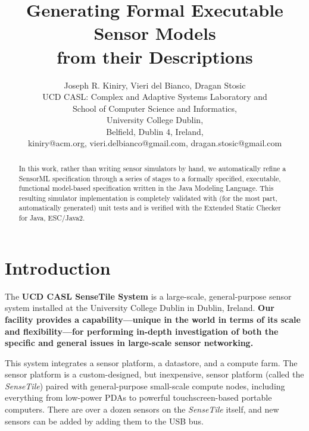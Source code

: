 \documentclass{article}
\newcommand{\ST}{\emph{SenseTile}\xspace}
\begin{document}
\title{Generating Formal Executable Sensor Models\\ from their Descriptions}

\author{Joseph R. Kiniry, Vieri del Bianco, Dragan Stosic\\
UCD CASL: Complex and Adaptive Systems Laboratory and\\
School of Computer Science and Informatics,\\
University College Dublin,\\
Belfield, Dublin 4, Ireland,\\
kiniry@acm.org, vieri.delbianco@gmail.com, dragan.stosic@gmail.com\\
}

\maketitle

\begin{abstract}

  In this work, rather than writing sensor simulators by hand, we
  automatically refine a SensorML specification through a series of
  stages to a formally specified, executable, functional
  model-based specification written in the Java Modeling Language.
  This resulting simulator implementation is completely validated with
  (for the most part, automatically generated) unit tests and is
  verified with the Extended Static Checker for Java, ESC/Java2.

\end{abstract}

\section{Introduction}

The \textbf{UCD CASL SenseTile System} is a large-scale, general-purpose
sensor system installed at the University College Dublin in Dublin,
Ireland.  \textbf{Our facility provides a capability---unique in the world in
terms of its scale and flexibility---for performing in-depth
investigation of both the specific and general issues in large-scale
sensor networking.}

This system integrates a sensor platform, a datastore, and a compute
farm.  The sensor platform is a custom-designed, but inexpensive,
sensor platform (called the \ST) paired with general-purpose
small-scale compute nodes, including everything from low-power PDAs to
powerful touchscreen-based portable computers.  There are over a dozen
sensors on the \ST itself, and new sensors can be added by adding them
to the USB bus.
\end{document}
